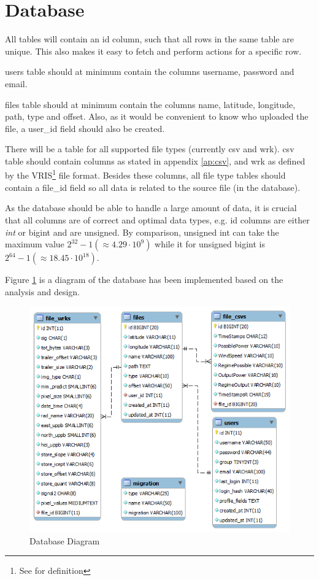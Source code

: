 \section{Database}
All tables will contain an \textsf{id} column, such that all rows in the same table are unique. This also makes it easy to fetch and perform actions for a specific row.

\textsf{users} table should at minimum contain the columns \textsf{username, password} and \textsf{email}.

\textsf{files} table should at minimum contain the columns \textsf{name, latitude, longitude, path, type} and \textsf{offset}.
Also, as it would be convenient to know who uploaded the file, a \textsf{user\_id} field should also be created.

There will be a table for all supported file types (currently \textsf{csv} and \textsf{wrk}). \textsf{csv} table should contain columns as stated in appendix \ref{ap:csv}, and \textsf{wrk} as defined by the VRIS\footnote{See \cite{VRIS} for definition} file format. Besides these columns, all file type tables should contain a \textsf{file\_id} field so all data is related to the source file (in the database).

As the database should be able to handle a large amount of data, it is crucial that all columns are of correct and optimal data types, e.g. \textsf{id} columns are either \textit{int} or \textsf{bigint} and are \textsf{unsigned}. By comparison, \textsf{unsigned int} can take the maximum value $2^{32}-1 (\approx 4.29 \cdot 10^{9})$ while it for \textsf{unsigned bigint} is $ 2^{64}-1 (\approx 18.45 \cdot 10^{18})$.

Figure \ref{fig:dbdiagram} is a diagram of the database has been implemented based on the analysis and design.

\begin{figure}[htbp]
   \centering
   \includegraphics[width=1\linewidth]{figure/db}
   \caption{Database Diagram}
   \label{fig:dbdiagram}
\end{figure}

